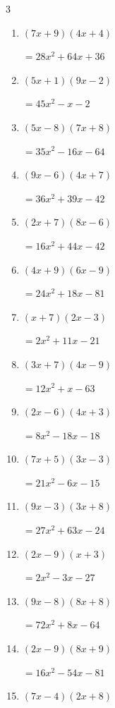\begin{multicols}{3}
\begin{enumerate}
        $=27x^{2}-27x-12$

\columnbreak %

  \item $(7x+9)(4x+4)$

        $=28x^{2}+64x+36$

  \item $(5x+1)(9x-2)$

        $=45x^{2}-x-2$

  \item $(5x-8)(7x+8)$

        $=35x^{2}-16x-64$

  \item $(9x-6)(4x+7)$

        $=36x^{2}+39x-42$

  \item $(2x+7)(8x-6)$

        $=16x^{2}+44x-42$

  \item $(4x+9)(6x-9)$

        $=24x^{2}+18x-81$

  \item $(x+7)(2x-3)$

        $=2x^{2}+11x-21$

  \item $(3x+7)(4x-9)$

        $=12x^{2}+x-63$

  \item $(2x-6)(4x+3)$

        $=8x^{2}-18x-18$

  \item $(7x+5)(3x-3)$

        $=21x^{2}-6x-15$

  \item $(9x-3)(3x+8)$

        $=27x^{2}+63x-24$

  \item $(2x-9)(x+3)$

        $=2x^{2}-3x-27$

  \item $(9x-8)(8x+8)$

        $=72x^{2}+8x-64$

  \item $(2x-9)(8x+9)$

        $=16x^{2}-54x-81$

  \item $(7x-4)(2x+8)$


\end{enumerate}
\end{multicols}
